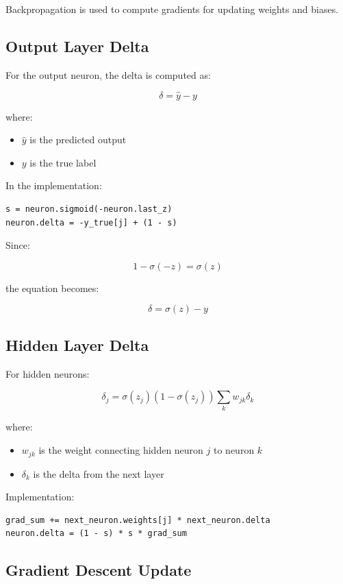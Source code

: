 \documentclass[12pt]{article}
\begin{document}
Backpropagation is used to compute gradients for updating weights and biases.

\subsection{Output Layer Delta}

For the output neuron, the delta is computed as:

\[
\delta = \hat{y} - y
\]

where:
\begin{itemize}
    \item $\hat{y}$ is the predicted output
    \item $y$ is the true label
\end{itemize}

In the implementation:

\begin{verbatim}
s = neuron.sigmoid(-neuron.last_z)
neuron.delta = -y_true[j] + (1 - s)
\end{verbatim}

Since:

\[
1 - \sigma(-z) = \sigma(z)
\]

the equation becomes:

\[
\delta = \sigma(z) - y
\]

\subsection{Hidden Layer Delta}

For hidden neurons:

\[
\delta_j = \sigma(z_j)(1 - \sigma(z_j))
\sum_k w_{jk}\delta_k
\]

where:
\begin{itemize}
    \item $w_{jk}$ is the weight connecting hidden neuron $j$ to neuron $k$
    \item $\delta_k$ is the delta from the next layer
\end{itemize}

Implementation:

\begin{verbatim}
grad_sum += next_neuron.weights[j] * next_neuron.delta
neuron.delta = (1 - s) * s * grad_sum
\end{verbatim}

\subsection{Gradient Descent Update}
\end{document}
